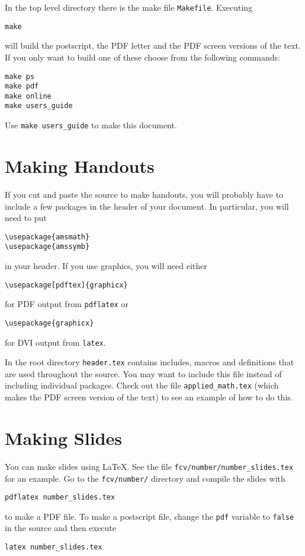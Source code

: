 \documentclass{article}
\begin{document}
In the top level directory there is the make file \verb+Makefile+.  Executing
\begin{verbatim}
make
\end{verbatim}
will build the postscript, the PDF letter and the PDF screen versions of the 
text.  If you only want to build one of these choose 
from the following commands:
\begin{verbatim}
make ps
make pdf
make online
make users_guide
\end{verbatim}
Use \verb+make users_guide+ to make this document.



\section{Making Handouts}

If you cut and paste the source to make handouts, you will probably have to
include a few packages in the header of your document.  In particular, you
will need to put
\begin{verbatim}
\usepackage{amsmath}
\usepackage{amssymb}
\end{verbatim}
in your header.  If you use graphics, you will need either
\begin{verbatim}
\usepackage[pdftex]{graphicx}
\end{verbatim}
for PDF output from \verb+pdflatex+ or
\begin{verbatim}
\usepackage{graphicx}
\end{verbatim}
for DVI output from \verb+latex+.

In the root directory \verb+header.tex+ contains includes, macros and 
definitions that are used throughout the source. You may want to 
include this file instead of including individual packages.  Check out
the file \verb+applied_math.tex+ (which makes the PDF screen version of 
the text) to see an example of how to do this.



\section{Making Slides}

You can make slides using \LaTeX.  See the file 
\verb+fcv/number/number_slides.tex+ for an example.  Go to the 
\verb+fcv/number/+ directory and compile the slides with 
\begin{verbatim}
pdflatex number_slides.tex
\end{verbatim}
to make a PDF file.
To make a postscript file, change the \verb+pdf+ variable to 
\verb+false+ in the source and then execute 
\begin{verbatim}
latex number_slides.tex
\end{verbatim}
\end{document}
